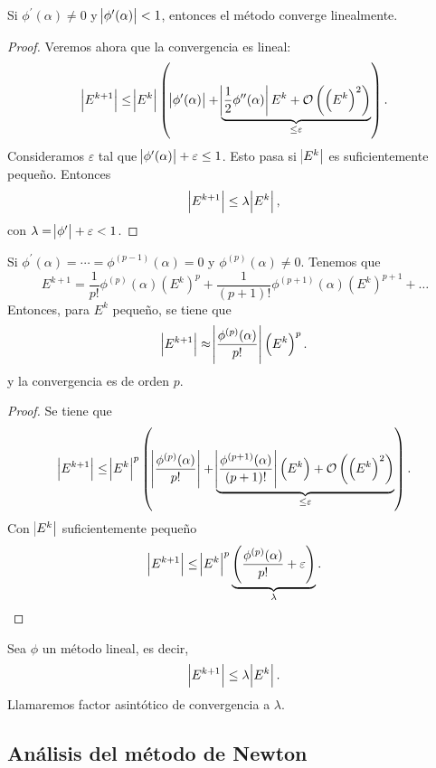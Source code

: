 \begin{prop}
    Si $\phi^\prime(\alpha) \neq 0$ y $\abs{\phi^\prime(\alpha)} < 1$, entonces el método converge linealmente.
\end{prop}

\begin{proof}
    Veremos ahora que la convergencia es lineal:
    \[
        \abs{E^{k+1}} \leq \abs{E^k} \left( \abs{\phi^\prime(\alpha)} + 
            \underbrace{\abs{\frac{1}{2} \phi^{\prime \prime}(\alpha)} E^k +
            \mathcal{O}\left( \left( E^k \right)^2 \right)}_{\leq \varepsilon} \right).
    \]
    Consideramos $\varepsilon$ tal que $\abs{\phi^\prime(\alpha)} + \varepsilon \leq 1$. Esto pasa
    si $\abs{E^k}$ es suficientemente pequeño. Entonces
    \[
        \abs{E^{k+1}} \leq \lambda \abs{E^k},
    \]
    con $\lambda = \abs{\phi^\prime} + \varepsilon < 1$.
\end{proof}

\begin{prop}
    Si $\phi^\prime(\alpha) = \cdots = \phi^{(p-1)}(\alpha) = 0$ y $\phi^{(p)}(\alpha) \neq 0$. Tenemos que
    \[
        E^{k+1} = \frac{1}{p!}\phi^{(p)}(\alpha) \left( E^k \right)^p +
        \frac{1}{(p+1)!} \phi^{(p+1)}(\alpha) \left( E^k \right)^{p+1} + \dots
    \]
    Entonces, para $E^k$ pequeño, se tiene que
    \[
        \abs{E^{k+1}} \approx \abs{\frac{\phi^{(p)}(\alpha)}{p!}} \left( E^k \right)^p.
    \]
    y la convergencia es de orden $p$.
\end{prop}

\begin{proof}
    Se tiene que
    \[
        \abs{E^{k+1}} \leq \abs{E^k}^p \left( \abs{\frac{\phi^{(p)}(\alpha)}{p!}} +
        \underbrace{\abs{\frac{\phi^{(p+1)}(\alpha)}{(p+1)!}} \left( E^k \right) +
        \mathcal{O}\left( \left( E^k \right)^2 \right)}_{\leq \varepsilon} \right).
    \]
    Con $\abs{E^k}$ suficientemente pequeño
    \[
        \abs{E^{k+1}} \leq \abs{E^k}^p
        \underbrace{\left( \frac{\phi^{(p)}(\alpha)}{p!} + \varepsilon  \right)}_{\lambda}.
    \]
\end{proof}

\begin{defi}
    Sea $\phi$ un método lineal, es decir,
    \[
        \abs{E^{k+1}} \leq \lambda \abs{E^k}.
    \]
    Llamaremos factor asintótico de convergencia a $\lambda$.
\end{defi}

\subsection{Análisis del método de Newton}

